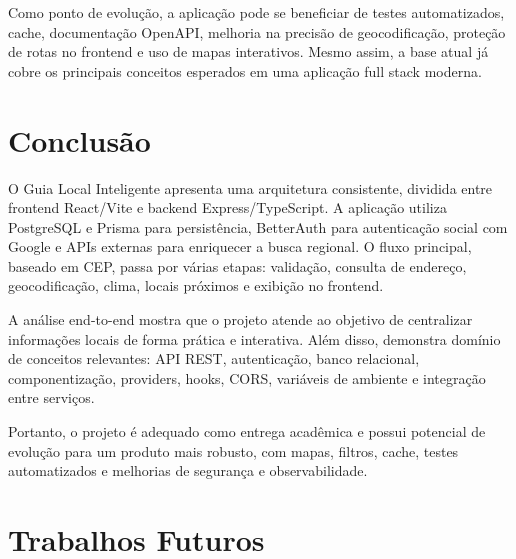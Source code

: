 \documentclass[
    12pt,
    oneside,
    openright,
    a4paper,
    english,
    brazil
]{abntex2}
\begin{document}
Como ponto de evolução, a aplicação pode se beneficiar de testes automatizados, cache, documentação OpenAPI, melhoria na precisão de geocodificação, proteção de rotas no frontend e uso de mapas interativos. Mesmo assim, a base atual já cobre os principais conceitos esperados em uma aplicação full stack moderna.


\chapter{Conclusão}

O Guia Local Inteligente apresenta uma arquitetura consistente, dividida entre frontend React/Vite e backend Express/TypeScript. A aplicação utiliza PostgreSQL e Prisma para persistência, BetterAuth para autenticação social com Google e APIs externas para enriquecer a busca regional. O fluxo principal, baseado em CEP, passa por várias etapas: validação, consulta de endereço, geocodificação, clima, locais próximos e exibição no frontend.

A análise end-to-end mostra que o projeto atende ao objetivo de centralizar informações locais de forma prática e interativa. Além disso, demonstra domínio de conceitos relevantes: API REST, autenticação, banco relacional, componentização, providers, hooks, CORS, variáveis de ambiente e integração entre serviços.

Portanto, o projeto é adequado como entrega acadêmica e possui potencial de evolução para um produto mais robusto, com mapas, filtros, cache, testes automatizados e melhorias de segurança e observabilidade.


\chapter{Trabalhos Futuros}
\end{document}
